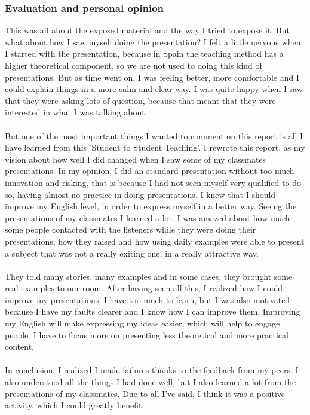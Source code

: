 \subsubsection{Evaluation and personal opinion}
This was all about the exposed material and the way I tried to expose it. But what about how I saw myself doing the presentation? I felt a little nervous 
when I started with the presentation, because in Spain the teaching method has a higher theoretical component, so we are not used to doing this kind of 
presentations. But as time went on, I was feeling better, more comfortable and I could explain things in a more calm and clear way. I was quite happy 
when I saw that they were asking lots of question, because that meant that they were interested in what I was talking about.\\\\
But one of the most important things I wanted to comment on this report is all I have learned from this 'Student to Student Teaching'. I rewrote this report, as my vision about how well I did changed when I saw some of my classmates presentations. In my opinion, 
I did an standard presentation without too much innovation and risking, that is because I had not seen myself very qualified to do so, having almost no practice 
in doing presentations. I knew that I should improve my English level, in order to express myself in a better way. Seeing the presentations of my
 classmates I learned a lot. I was amazed about how much some people contacted with the listeners while they were doing their presentations, how they raised 
and how using daily examples were able to present a subject that was not a really exiting one, in a really attractive way.\\\\
They told many stories, many examples and in some cases, they brought some real examples to our room. After having seen all this, I realized how I could improve my
 presentations, I have too much to learn, but I was also motivated because I have my faults clearer and I know how I can improve them. Improving my English will 
make expressing my ideas easier, which will help to engage people. I have to focus more on presenting less theoretical and more practical content.\\\\
In conclusion, I realized I made failures thanks to the feedback from my peers. I also understood all the things I had done well, but I also learned a lot from 
the presentations of my classmates. Due to all I've said, I think it was a positive activity, which I could greatly benefit.
